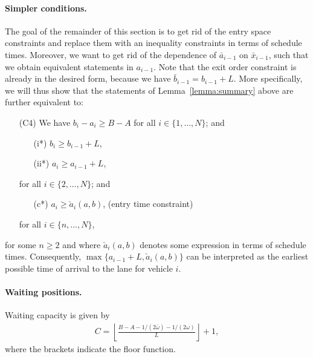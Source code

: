 \documentclass[a4paper]{report}
\theoremstyle{definition}
\theoremstyle{plain}
\begin{document}
\paragraph{Simpler conditions.}
The goal of the remainder of this section is to get rid of the entry space
constraints and replace them with an inequality constraints in terms of schedule
times.
%
Moreover, we want to get rid of the dependence of $\bar{a}_{i-1}$ on
$\bar{x}_{i-1}$, such that we obtain equivalent statements in $a_{i-1}$. Note
that the exit order constraint is already in the desired form, because we have
$\bar{b}_{i-1} = b_{i-1} + L$.
%
More specifically, we will thus show that the statements of
Lemma~\ref{lemma:summary} above are further equivalent to:
\begin{enumerate}[leftmargin=3em]
  \item[(C4)] We have $b_{i} - a_{i} \geq B-A$ for all $i \in \{1, \dots, N\}$; and
  \begin{enumerate}[leftmargin=4em,midpenalty=10]
    \item[(i*)\quad] $b_{i} \geq b_{i-1} + L$,
    \item[(ii*)\quad] $a_{i} \geq a_{i-1} + L$,
  \end{enumerate}
  \TabPositions{3cm}
  for all $i \in \{2, \dots, N\}$; and
  \begin{enumerate}[leftmargin=4em,midpenalty=10]
    \item[(c*)\quad] $a_{i} \geq \check{a}_i(a,b)$, \tab (entry time constraint)
  \end{enumerate}
  for all $i \in \{n, \dots, N \}$,
\end{enumerate}
for some $n \geq 2$ and where $\check{a}_{i}(a,b)$ denotes some expression in terms of
schedule times. Consequently, $\max\{a_{i-1} + L, \check{a}_{i}(a,b)\}$ can be
interpreted as the earliest possible time of arrival to the lane for vehicle
$i$.

\paragraph{Waiting positions.}
Waiting capacity is given by
\begin{align}
  C = \left\lfloor \frac{B-A-1/(2\bar{\omega}) -1/(2\omega)}{L} \right\rfloor + 1 ,
\end{align}
where the brackets indicate the floor function.
\end{document}
